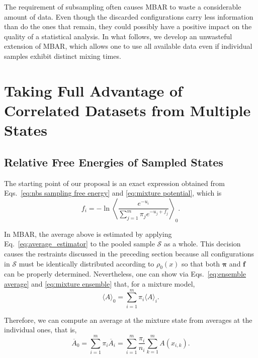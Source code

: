 \documentclass[aip,jcp,reprint,amsmath,amssymb]{revtex4-1}
\newcommand{\vt}[1]{\boldsymbol{\mathbf{#1}}}           %
\begin{document}
The requirement of subsampling often causes MBAR to waste a considerable amount of data. Even though the discarded configurations carry less information than do the ones that remain, they could possibly have a positive impact on the quality of a statistical analysis. In what follows, we develop an unwasteful extension of MBAR, which allows one to use all available data even if individual samples exhibit distinct mixing times.

\section{Taking Full Advantage of Correlated Datasets from Multiple States}

\subsection{Relative Free Energies of Sampled States}

The starting point of our proposal is an exact expression obtained from Eqs.~\eqref{eq:nbs sampling free energy} and \eqref{eq:mixture potential}, which is
\begin{equation}
\label{eq:free energy exact}
f_i = -\ln \left\langle \frac{e^{-u_i}}{\sum_{j=1}^m \pi_j e^{-u_j + f_j}} \right\rangle_0.
\end{equation}

In MBAR, the average above is estimated by applying Eq.~\eqref{eq:average_estimator} to the pooled sample $\mathcal S$ as a whole. This decision causes the restraints discussed in the preceding section because all configurations in $\mathcal S$ must be identically distributed according to $\rho_0(x)$ so that both $\vt \pi$ and $\vt f$ can be properly determined. Nevertheless, one can show via Eqs.~\eqref{eq:ensemble average} and \eqref{eq:mixture ensemble} that, for a mixture model,
\begin{equation}
\label{eq:mixture average}
\langle A \rangle_0 = \sum_{i=1}^m \pi_i \langle A \rangle_i.
\end{equation}

Therefore, we can compute an average at the mixture state from averages at the individual ones, that is,
\begin{equation}
\label{eq:mixture average estimator}
{\overline A}_0 = \sum_{i=1}^m \pi_i \overline{A}_i = \sum_{i=1}^m \frac{\pi_i}{n_i} \sum_{k=1}^m A(x_{i,k}).
\end{equation}
\end{document}
